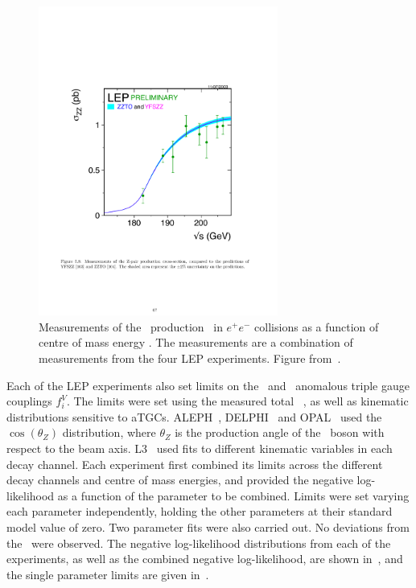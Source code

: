 \begin{figure}
\centering
        \includegraphics[width=0.7\textwidth]{lep_cx}
    \caption[Measurements of the \ZZ\ production \cx\ in  $e^+e^-$
    collisions at LEP as a function of centre of mass energy \sqrts.]{Measurements of the \ZZ\ production \cx\ in  $e^+e^-$
    collisions as a function of centre of mass energy \sqrts. The
    measurements are a combination of measurements from the four LEP
    experiments. Figure from~\cite{bib:LEPEW2006}.}
    \label{fig:lep-cx}
\end{figure}

Each of the LEP experiments also set limits on the \ZZZ\ and \ZZg\ anomalous
triple gauge couplings $f_{i}^{V}$. The limits were set using the measured total
\ZZ\ \cx, as well as kinematic distributions sensitive to aTGCs.
ALEPH~\cite{Schael:1166743}, DELPHI~\cite{Bambade:1002930} and
OPAL~\cite{Abbiendi:2000kq} used the $\cos(\theta_{Z})$ distribution, where
$\theta_{Z}$ is the production angle of the \Z\ boson with respect to the beam
axis. L3~\cite{Acciarri:1999ug} used fits to different kinematic variables in
each decay channel. Each experiment first combined its limits across the different
decay channels and centre of mass energies, and provided the negative
log-likelihood as a function of the parameter to be combined. Limits were set
varying each parameter independently, holding the other parameters at their
standard model value of zero. Two parameter
fits were also carried out. No deviations from the \sm\ were observed. The
negative log-likelihood distributions from each of the experiments, as well as the
combined negative log-likelihood, are shown in~, and the single
parameter limits are given in~.

